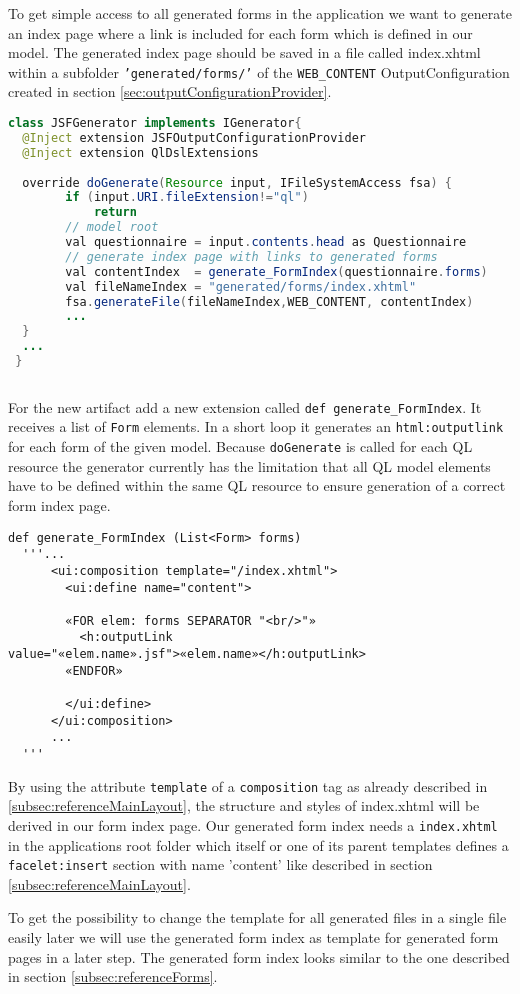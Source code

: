 To get simple access to all generated forms in the application
 we want to generate an index page where a link is included for each form which is defined
in our model.
The generated index page should be saved in a file called index.xhtml within a
subfolder \texttt{'generated/forms/'} of the \texttt{WEB\_CONTENT}
OutputConfiguration created in section \ref{sec:outputConfigurationProvider}.

\begin{lstlisting}[language=Java] 
class JSFGenerator implements IGenerator{
  @Inject extension JSFOutputConfigurationProvider
  @Inject extension QlDslExtensions
  
  override doGenerate(Resource input, IFileSystemAccess fsa) {
        if (input.URI.fileExtension!="ql")
            return
		// model root
        val questionnaire = input.contents.head as Questionnaire
		// generate index page with links to generated forms
        val contentIndex  = generate_FormIndex(questionnaire.forms)
        val fileNameIndex = "generated/forms/index.xhtml"
        fsa.generateFile(fileNameIndex,WEB_CONTENT, contentIndex)
        ...
  }
  ...
 }
      
\end{lstlisting}

For the new artifact add a new extension called \texttt{def
generate\_FormIndex}.
It receives a list of \texttt{Form} elements. In a short loop it generates an
\texttt{html:outputlink} for each form of the given model. Because
\texttt{doGenerate} is called for each QL resource the generator currently has the limitation that all
QL model elements have to be defined within the same QL resource to ensure
generation of a correct form index page.

\begin{lstlisting}[language=Xtend] 
  def generate_FormIndex (List<Form> forms)
  '''...
      <ui:composition template="/index.xhtml">
        <ui:define name="content">
        
        «FOR elem: forms SEPARATOR "<br/>"»
          <h:outputLink value="«elem.name».jsf">«elem.name»</h:outputLink>
        «ENDFOR»
        
        </ui:define>
      </ui:composition>
      ... 
  '''
\end{lstlisting}
 
By using the attribute \texttt{template} of a \texttt{composition} tag as
already described in \ref{subsec:referenceMainLayout}, the structure and styles of
index.xhtml will be derived in our form index page. Our generated form index
needs a \texttt{index.xhtml} in the applications root folder which itself or one of its
parent templates defines a \texttt{facelet:insert} section with name 'content'
like described in section \ref{subsec:referenceMainLayout}.

To get the possibility to change the template for all generated files in
a single file easily later we will use the generated form index as template for
generated form pages in a later step. The generated form index looks similar to
the one described in section \ref{subsec:referenceForms}.
